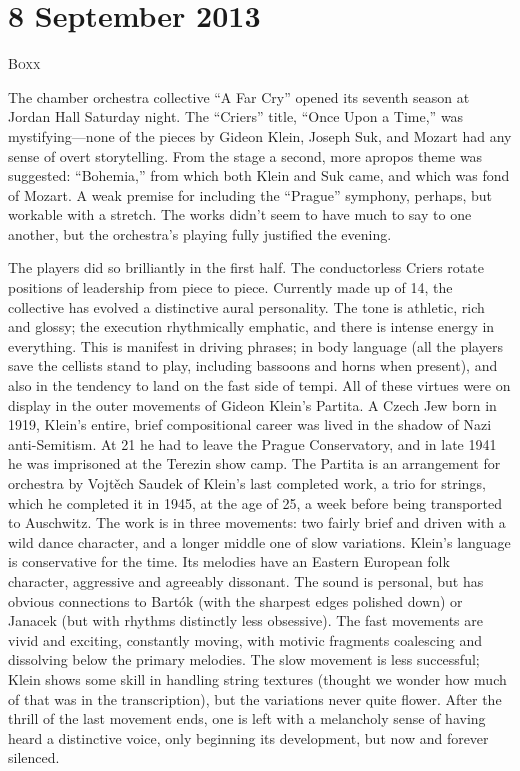 \chapter{8 September 2013}

\textsc{Boxx}

The chamber orchestra collective “A Far Cry” opened its seventh season at Jordan Hall Saturday night. The “Criers” title, “Once Upon a Time,” was mystifying—none of the pieces by Gideon Klein, Joseph Suk, and Mozart had any sense of overt storytelling. From the stage a second, more apropos theme was suggested: “Bohemia,” from which both Klein and Suk came, and which was fond of Mozart. A weak premise for including the “Prague” symphony, perhaps, but workable with a stretch. The works didn’t seem to have much to say to one another, but the orchestra’s playing fully justified the evening.

The players did so brilliantly in the first half. The conductorless Criers rotate positions of leadership from piece to piece. Currently made up of 14, the collective has evolved a distinctive aural personality. The tone is athletic, rich and glossy; the execution rhythmically emphatic, and there is intense energy in everything. This is manifest in driving phrases; in body language (all the players save the cellists stand to play, including bassoons and horns when present), and also in the tendency to land on the fast side of tempi. All of these virtues were on display in the outer movements of Gideon Klein’s Partita. A Czech Jew born in 1919, Klein’s entire, brief compositional career was lived in the shadow of Nazi anti-Semitism. At 21 he had to leave the Prague Conservatory, and in late 1941 he was imprisoned at the Terezin show camp. The Partita is an arrangement for orchestra by Vojtěch Saudek of Klein’s last completed work, a trio for strings, which he completed it in 1945, at the age of 25, a week before being transported to Auschwitz. The work is in three movements: two fairly brief and driven with a wild dance character, and a longer middle one of slow variations. Klein’s language is conservative for the time. Its melodies have an Eastern European folk character, aggressive and agreeably dissonant. The sound is personal, but has obvious connections to Bartók (with the sharpest edges polished down) or Janacek (but with rhythms distinctly less obsessive). The fast movements are vivid and exciting, constantly moving, with motivic fragments coalescing and dissolving below the primary melodies. The slow movement is less successful; Klein shows some skill in handling string textures (thought we wonder how much of that was in the transcription), but the variations never quite flower. After the thrill of the last movement ends, one is left with a melancholy sense of having heard a distinctive voice, only beginning its development, but now and forever silenced.


